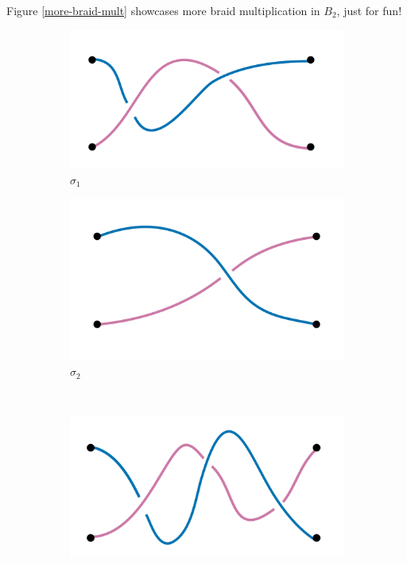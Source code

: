 \documentclass{amsart}
\begin{document}
\begin{example} 
	Figure \ref{more-braid-mult} showcases more braid multiplication in \(B_2\),
	just for fun!
	\begin{figure}[h!]
		\begin{subfigure}{.5\textwidth}
			\centering
			\includegraphics[width=.9\linewidth]{Inkscape Files/sigma1.png}
			\caption{\(\sigma_1\)}
		\end{subfigure}%
		\begin{subfigure}{.5\textwidth}
			\centering
			\includegraphics[width=.9\linewidth]{Inkscape Files/sigma2.png}
			\caption{\(\sigma_2\)}
		\end{subfigure}%
		\\  
		\begin{subfigure}{.5\textwidth}
			\centering
			\includegraphics[width=.9\linewidth]{Inkscape Files/sigma1sigma2.png}

\end{subfigure}
\end{figure}
\end{example}
\end{document}
